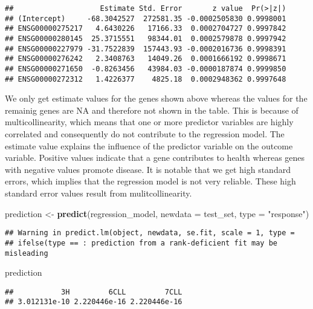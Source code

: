 \documentclass[]{article}
\newenvironment{Shaded}{\begin{snugshade}}{\end{snugshade}}
\newcommand{\KeywordTok}[1]{\textcolor[rgb]{0.13,0.29,0.53}{\textbf{#1}}}
\newcommand{\DataTypeTok}[1]{\textcolor[rgb]{0.13,0.29,0.53}{#1}}
\newcommand{\StringTok}[1]{\textcolor[rgb]{0.31,0.60,0.02}{#1}}
\newcommand{\NormalTok}[1]{#1}
\begin{document}
\begin{verbatim}
##                    Estimate Std. Error       z value  Pr(>|z|)
## (Intercept)     -68.3042527  272581.35 -0.0002505830 0.9998001
## ENSG00000275217   4.6430226   17166.33  0.0002704727 0.9997842
## ENSG00000280145  25.3715551   98344.01  0.0002579878 0.9997942
## ENSG00000227979 -31.7522839  157443.93 -0.0002016736 0.9998391
## ENSG00000276242   2.3408763   14049.26  0.0001666192 0.9998671
## ENSG00000271650  -0.8263456   43984.03 -0.0000187874 0.9999850
## ENSG00000272312   1.4226377    4825.18  0.0002948362 0.9997648
\end{verbatim}

We only get estimate values for the genes shown above whereas the values
for the remainig genes are NA and therefore not shown in the table. This
is because of multicollinearity, which means that one or more predictor
variables are highly correlated and consequently do not contribute to
the regression model. The estimate value explains the influence of the
predictor variable on the outcome variable. Positive values indicate
that a gene contributes to health whereas genes with negative values
promote disease. It is notable that we get high standard errors, which
implies that the regression model is not very reliable. These high
standard error values result from mulitcollinearity.

\begin{Shaded}
\begin{Highlighting}[]
\NormalTok{prediction <-}\StringTok{ }\KeywordTok{predict}\NormalTok{(regression_model, }\DataTypeTok{newdata =}\NormalTok{ test_set, }\DataTypeTok{type =} \StringTok{"response"}\NormalTok{)}
\end{Highlighting}
\end{Shaded}

\begin{verbatim}
## Warning in predict.lm(object, newdata, se.fit, scale = 1, type =
## ifelse(type == : prediction from a rank-deficient fit may be misleading
\end{verbatim}

\begin{Shaded}
\begin{Highlighting}[]
\NormalTok{prediction}
\end{Highlighting}
\end{Shaded}

\begin{verbatim}
##           3H         6CLL         7CLL 
## 3.012131e-10 2.220446e-16 2.220446e-16
\end{verbatim}
\end{document}
